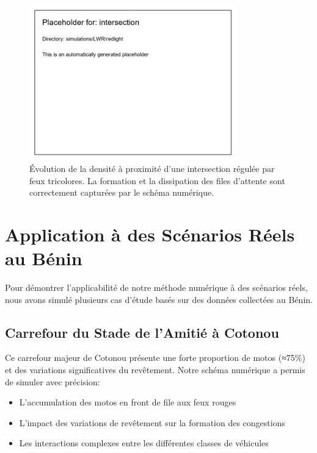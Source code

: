\begin{figure}[htbp]
\centering
\includegraphics[width=0.8\textwidth]{simulations/LWR/redlight/intersection}
\caption{Évolution de la densité à proximité d'une intersection régulée par feux tricolores. La formation et la dissipation des files d'attente sont correctement capturées par le schéma numérique.}
\label{fig:intersection}
\end{figure}

\section{Application à des Scénarios Réels au Bénin}
\label{sec:application_benin}

Pour démontrer l'applicabilité de notre méthode numérique à des scénarios réels, nous avons simulé plusieurs cas d'étude basés sur des données collectées au Bénin.

\subsection{Carrefour du Stade de l'Amitié à Cotonou}
\label{subsec:carrefour_stade}

Ce carrefour majeur de Cotonou présente une forte proportion de motos (≈75\%) et des variations significatives du revêtement. Notre schéma numérique a permis de simuler avec précision:

\begin{itemize}
\item L'accumulation des motos en front de file aux feux rouges
\item L'impact des variations de revêtement sur la formation des congestions
\item Les interactions complexes entre les différentes classes de véhicules
\end{itemize}

